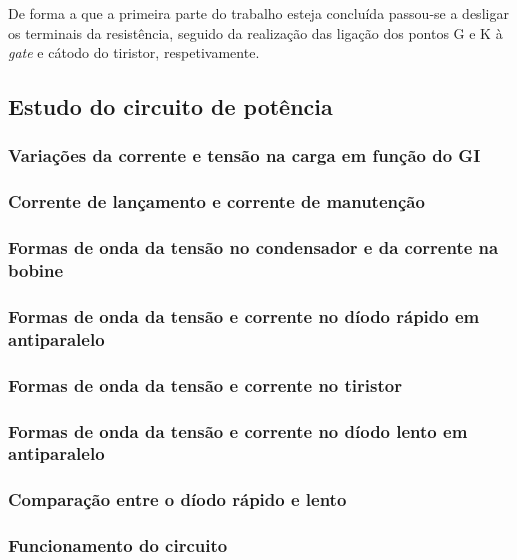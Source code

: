 \documentclass[a4paper,11pt]{article}
\numberwithin{equation}{section}
\begin{document}
De forma a que a primeira parte do trabalho esteja concluída passou-se a desligar os terminais da resistência, seguido da realização das ligação dos pontos G e K à \textit{gate} e cátodo do tiristor, respetivamente.

\subsection{Estudo do circuito de potência}

\subsubsection{Variações da corrente e tensão na carga em função do GI}

\subsubsection{Corrente de lançamento e corrente de manutenção}

\subsubsection{Formas de onda da tensão no condensador e da corrente na bobine}

\subsubsection{Formas de onda da tensão e corrente no díodo rápido em antiparalelo}

\subsubsection{Formas de onda da tensão e corrente no tiristor}

\subsubsection{Formas de onda da tensão e corrente no díodo lento em antiparalelo}

\subsubsection{Comparação entre o díodo rápido e lento}

\subsubsection{Funcionamento do circuito}
\end{document}
